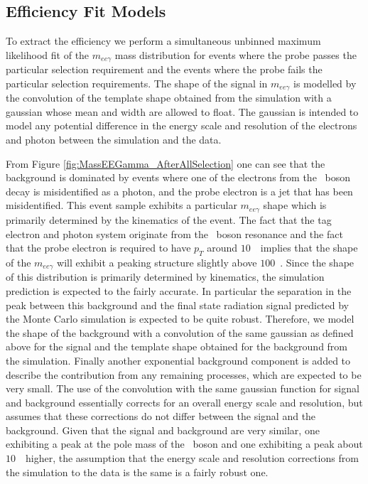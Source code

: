 \documentclass{cmspaper}
\begin{document}
\subsection{ Efficiency Fit Models }

To extract the efficiency we perform a simultaneous unbinned maximum likelihood fit of the $m_{ee\gamma}$ mass 
distribution for events where the probe passes the particular selection requirement and the events where 
the probe fails the particular selection requirements. The shape of the signal in $m_{ee\gamma}$ is 
modelled by the convolution of the template shape obtained from the simulation with a gaussian whose 
mean and width are allowed to float. The gaussian is intended to model any potential difference in
the energy scale and resolution of the electrons and photon between the simulation and the data. 

From Figure \ref{fig:MassEEGamma_AfterAllSelection} one can see that the background is dominated by events
where one of the electrons from the \Z\ boson decay is misidentified as a photon, and the probe electron
is a jet that has been misidentified. This event sample exhibits a particular $m_{ee\gamma}$ shape which is
primarily determined by the kinematics of the event. The fact that the tag electron and photon system originate
from the \Z\ boson resonance and the fact that the probe electron is required to have $p_{T}$ around $10$~\GeV\ 
implies that the shape of the $m_{ee\gamma}$ will exhibit a peaking structure slightly
above $100$~\GeV. Since the shape of this distribution is primarily determined by kinematics, the simulation
prediction is expected to the fairly accurate. In particular the separation in the peak between this background
and the final state radiation signal predicted by the Monte Carlo simulation is expected to be quite robust. 
Therefore, we model the shape of the background with a convolution of the same gaussian as defined above for the 
signal and the template shape obtained for the background from the simulation. Finally another exponential
background component is added to describe the contribution from any remaining processes, which are expected to be
very small. The use of the convolution with the same gaussian function for signal and background essentially
corrects for an overall energy scale and resolution, but assumes that these corrections do not differ between
the signal and the background. Given that the signal and background are very similar, one exhibiting a peak at the
pole mass of the \Z\ boson and one exhibiting a peak about $10$~\GeV\ higher, the assumption that the energy
scale and resolution corrections from the simulation to the data is the same is a fairly robust one. 
\end{document}
